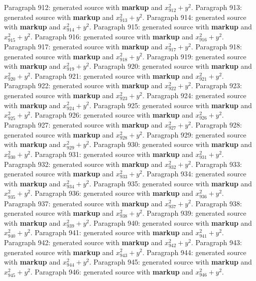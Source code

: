 \documentclass{article}
\begin{document}
Paragraph 912: generated source with \textbf{markup} and $x_{912}^2 + y^2$.
Paragraph 913: generated source with \textbf{markup} and $x_{913}^2 + y^2$.
Paragraph 914: generated source with \textbf{markup} and $x_{914}^2 + y^2$.
Paragraph 915: generated source with \textbf{markup} and $x_{915}^2 + y^2$.
Paragraph 916: generated source with \textbf{markup} and $x_{916}^2 + y^2$.
Paragraph 917: generated source with \textbf{markup} and $x_{917}^2 + y^2$.
Paragraph 918: generated source with \textbf{markup} and $x_{918}^2 + y^2$.
Paragraph 919: generated source with \textbf{markup} and $x_{919}^2 + y^2$.
Paragraph 920: generated source with \textbf{markup} and $x_{920}^2 + y^2$.
Paragraph 921: generated source with \textbf{markup} and $x_{921}^2 + y^2$.
Paragraph 922: generated source with \textbf{markup} and $x_{922}^2 + y^2$.
Paragraph 923: generated source with \textbf{markup} and $x_{923}^2 + y^2$.
Paragraph 924: generated source with \textbf{markup} and $x_{924}^2 + y^2$.
Paragraph 925: generated source with \textbf{markup} and $x_{925}^2 + y^2$.
Paragraph 926: generated source with \textbf{markup} and $x_{926}^2 + y^2$.
Paragraph 927: generated source with \textbf{markup} and $x_{927}^2 + y^2$.
Paragraph 928: generated source with \textbf{markup} and $x_{928}^2 + y^2$.
Paragraph 929: generated source with \textbf{markup} and $x_{929}^2 + y^2$.
Paragraph 930: generated source with \textbf{markup} and $x_{930}^2 + y^2$.
Paragraph 931: generated source with \textbf{markup} and $x_{931}^2 + y^2$.
Paragraph 932: generated source with \textbf{markup} and $x_{932}^2 + y^2$.
Paragraph 933: generated source with \textbf{markup} and $x_{933}^2 + y^2$.
Paragraph 934: generated source with \textbf{markup} and $x_{934}^2 + y^2$.
Paragraph 935: generated source with \textbf{markup} and $x_{935}^2 + y^2$.
Paragraph 936: generated source with \textbf{markup} and $x_{936}^2 + y^2$.
Paragraph 937: generated source with \textbf{markup} and $x_{937}^2 + y^2$.
Paragraph 938: generated source with \textbf{markup} and $x_{938}^2 + y^2$.
Paragraph 939: generated source with \textbf{markup} and $x_{939}^2 + y^2$.
Paragraph 940: generated source with \textbf{markup} and $x_{940}^2 + y^2$.
Paragraph 941: generated source with \textbf{markup} and $x_{941}^2 + y^2$.
Paragraph 942: generated source with \textbf{markup} and $x_{942}^2 + y^2$.
Paragraph 943: generated source with \textbf{markup} and $x_{943}^2 + y^2$.
Paragraph 944: generated source with \textbf{markup} and $x_{944}^2 + y^2$.
Paragraph 945: generated source with \textbf{markup} and $x_{945}^2 + y^2$.
Paragraph 946: generated source with \textbf{markup} and $x_{946}^2 + y^2$.
\end{document}
